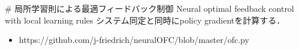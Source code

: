 # 局所学習則による最適フィードバック制御
Neural optimal feedback control with local learning rules
システム同定と同時にpolicy gradientを計算する．
\begin{itemize}
\item https://github.com/j-friedrich/neuralOFC/blob/master/ofc.py
\end{itemize}
   
\begin{lstlisting}[language=julia]

\end{lstlisting}
\begin{lstlisting}[language=julia]

\end{lstlisting}
\begin{lstlisting}[language=julia]

\end{lstlisting}
